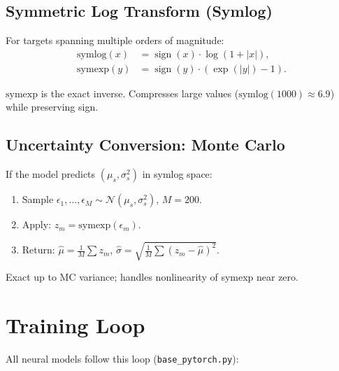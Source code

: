 \documentclass[11pt,a4paper]{article}
\theoremstyle{definition}
\DeclareMathOperator{\sign}{sign}
\begin{document}
\subsection{Symmetric Log Transform (Symlog)}

For targets spanning multiple orders of magnitude:
\begin{align}
  \mathrm{symlog}(x) &= \sign(x) \cdot \log(1 + |x|), \label{eq:symlog} \\
  \mathrm{symexp}(y) &= \sign(y) \cdot (\exp(|y|) - 1). \label{eq:symexp}
\end{align}

$\mathrm{symexp}$ is the exact inverse. Compresses large values
($\mathrm{symlog}(1000) \approx 6.9$) while preserving sign.

\subsection{Uncertainty Conversion: Monte Carlo}

If the model predicts $(\mu_s, \sigma_s^2)$ in symlog space:
\begin{enumerate}[nosep]
  \item Sample $\epsilon_1, \ldots, \epsilon_M \sim \mathcal{N}(\mu_s, \sigma_s^2)$, $M = 200$.
  \item Apply: $z_m = \mathrm{symexp}(\epsilon_m)$.
  \item Return: $\hat{\mu} = \frac{1}{M}\sum z_m$, $\hat{\sigma} = \sqrt{\frac{1}{M}\sum(z_m - \hat{\mu})^2}$.
\end{enumerate}

Exact up to MC variance; handles nonlinearity of symexp near zero.

\section{Training Loop}
\label{sec:training}

All neural models follow this loop (\texttt{base\_pytorch.py}):
\end{document}
